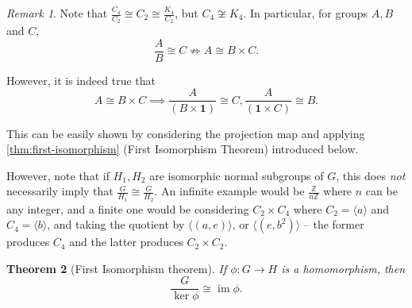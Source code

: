 \documentclass{article}
\newtheorem{theorem}{Theorem}[section]
\theoremstyle{definition}
\theoremstyle{remark}
\newtheorem{remark}[theorem]{Remark}
\newcommand{\pqty}[1]{\left(#1\right)}
\newcommand{\angBrac}[1]{\langle #1\rangle}
\newcommand{\flatfrac}[2]{\frac{#1}{#2}}
\newcommand{\functiondomain}[3]{#1:#2\to #3}
\newcommand{\isomorphic}{\cong}
\newcommand{\ZZ}{\mathbb{Z}}
\newcommand{\img}{\operatorname{im}}
\newcommand{\notisomorphic}{\not\cong}
\newcommand{\notimplies}{\not\Rightarrow}
\newcommand{\trivialgp}{\mathbf{1}}
\begin{document}
\begin{remark}
    Note that \(\flatfrac{C_4}{C_2} \isomorphic C_2 \isomorphic \flatfrac{K_4}{C_2}\), but \(C_4 \notisomorphic K_4\). In particular, for groups \(A, B\) and \(C\),
    \[
        \flatfrac{A}{B} \isomorphic C \notimplies A \isomorphic B \times C.
    \]

    However, it is indeed true that
    \[
        A \isomorphic B \times C \implies \flatfrac{A}{\pqty{B \times \trivialgp}} \isomorphic C, \flatfrac{A}{\pqty{\trivialgp \times C}} \isomorphic B.
    \]

    This can be easily shown by considering the projection map and applying \autoref{thm:first-isomorphism} (First Isomorphism Theorem) introduced below.

    However, note that if \(H_1, H_2\) are isomorphic normal subgroups of \(G\), this does \emph{not} necessarily imply that \(\flatfrac{G}{H_1} \isomorphic \flatfrac{G}{H_2}\). An infinite example would be \(\flatfrac{\ZZ}{n\ZZ}\) where \(n\) can be any integer, and a finite one would be considering \(C_2 \times C_4\) where \(C_2 = \angBrac{a}\) and \(C_4 = \angBrac{b}\), and taking the quotient by \(\angBrac{\pqty{a, e}}\), or \(\angBrac{\pqty{e, b^2}}\) -- the former produces \(C_4\) and the latter produces \(C_2 \times C_2\).
\end{remark}
    
\begin{theorem}[First Isomorphism theorem]
    \label{thm:first-isomorphism}%
    If \(\functiondomain{\phi}{G}{H}\) is a homomorphism, then
    \[
        \flatfrac{G}{\ker \phi} \isomorphic \img \phi.
    \]
\end{theorem}
\end{document}
